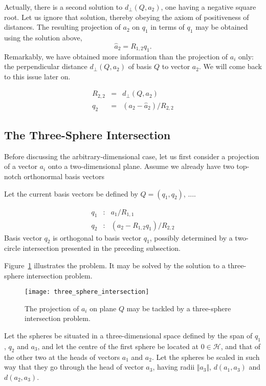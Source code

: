 \documentclass{article}
\newcommand{\sv}{Q}
\newcommand{\sve}{q}
\newcommand{\nonsve}{a}
\newcommand{\origin}{0}
\newcommand{\ce}{R}
\begin{document}
Actually, there is a second solution to $d_{\perp}(\sv,\nonsve_{2})$,
one having a negative square root. Let us ignore that solution, thereby
obeying the axiom of positiveness of distances. The resulting projection
of $\nonsve_{2}$ on $\sve_{1}$ in terms of $\sve_{1}$ may be obtained
using the solution above, \[
\hat{\nonsve}_{2}=\ce_{1,2}\sve_{1}.\]
Remarkably, we have obtained more information than the projection
of $\nonsve_{i}$ only: the perpendicular distance $d_{\perp}(\sv,\nonsve_{2})$
of basis $\sv$ to vector $\nonsve_{2}$. We will come back to this
issue later on.

\begin{eqnarray*}
\ce_{2,2} & = & d_{\perp}(\sv,\nonsve_{2})\\
\sve_{2} & = & (\nonsve_{2}-\hat{\nonsve}_{2})/\ce_{2,2}\end{eqnarray*}



\subsection{The Three-Sphere Intersection\label{subsection:three_sphere_intersection}}

Before discussing the arbitrary-dimensional case, let us first consider
a projection of a vector $\nonsve_{i}$ onto a two-dimensional plane.
Assume we already have two top-notch orthonormal basis vectors 

Let the current basis vectors be defined by $\sv=(\sve_{1},\sve_{2})$,
.... 

\begin{eqnarray*}
\sve_{1} & : & \nonsve_{1}/\ce_{1,1}\\
\sve_{2} & : & (\nonsve_{2}-\ce_{1,2}\sve_{1})/\ce_{2,2}\end{eqnarray*}
Basis vector $\sve_{2}$ is orthogonal to basis vector $\sve_{1}$,
possibly determined by a two-circle intersection presented in the
preceding subsection. 

Figure~\ref{figure:three_sphere_intersection} illustrates the problem.
It may be solved by the solution to a three-sphere intersection problem.
%
\begin{figure}
\begin{center}\texttt{[image: three\_sphere\_intersection]}\end{center}


\caption{The projection of $\nonsve_{i}$ on plane $\sv$ may be tackled by
a three-sphere intersection problem.\label{figure:three_sphere_intersection}}
\end{figure}
 Let the spheres be situated in a three-dimensional space defined
by the span of $\sve_{1}$, $\sve_{2}$ and $\nonsve_{3}$, and let
the centre of the first sphere be located at $\origin\in\mathcal{H}$,
and that of the other two at the heads of vectors $\nonsve_{1}$ and
$\nonsve_{2}$. Let the spheres be scaled in such way that they go
through the head of vector $\nonsve_{3}$, having radii $\Vert\nonsve_{3}\Vert$,
$d(\nonsve_{1},\nonsve_{3})$ and $d(\nonsve_{2},\nonsve_{3})$. 
\end{document}
